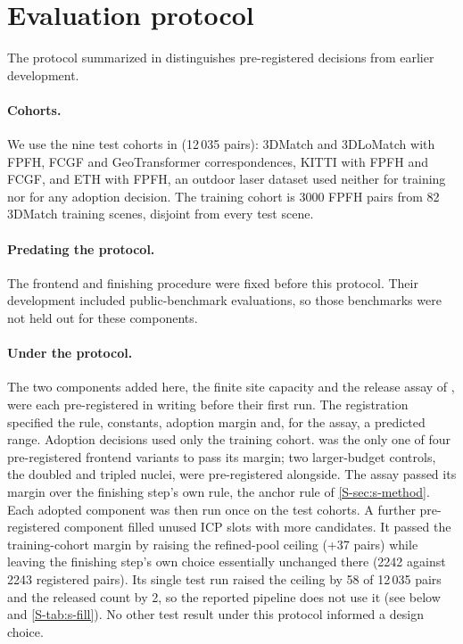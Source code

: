 \section{Evaluation protocol}
\label{S-sec:s-protocol}

The protocol summarized in  distinguishes pre-registered decisions from earlier development.

\paragraph{Cohorts.} We use the nine test cohorts in  (12\,035 pairs): 3DMatch and 3DLoMatch with FPFH, FCGF and GeoTransformer correspondences, KITTI with FPFH and FCGF, and ETH with FPFH, an outdoor laser dataset used neither for training nor for any adoption decision. The training cohort is 3000 FPFH pairs from 82 3DMatch training scenes, disjoint from every test scene.

\paragraph{Predating the protocol.} The \ngr{} frontend and finishing procedure were fixed before this protocol. Their development included public-benchmark evaluations, so those benchmarks were not held out for these components.

\paragraph{Under the protocol.} The two components added here, the finite site capacity and the release assay of , were each pre-registered in writing before their first run. The registration specified the rule, constants, adoption margin and, for the assay, a predicted range. Adoption decisions used only the training cohort. \ls{} was the only one of four pre-registered frontend variants to pass its margin; two larger-budget controls, the doubled and tripled nuclei, were pre-registered alongside. The assay passed its margin over the finishing step's own rule, the anchor rule of \cref{S-sec:s-method}. Each adopted component was then run once on the test cohorts. A further pre-registered component filled unused ICP slots with more candidates. It passed the training-cohort margin by raising the refined-pool ceiling (+37 pairs) while leaving the finishing step's own choice essentially unchanged there (2242 against 2243 registered pairs). Its single test run raised the ceiling by 58 of 12\,035 pairs and the released count by 2, so the reported pipeline does not use it (see below and \cref{S-tab:s-fill}). No other test result under this protocol informed a design choice.

